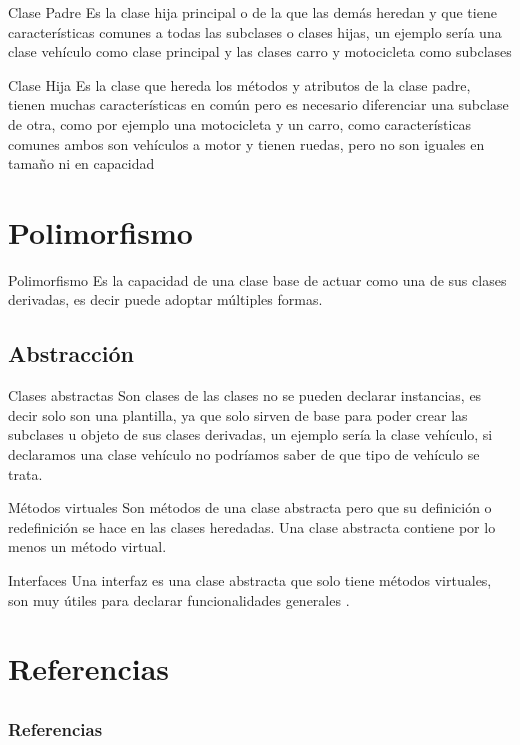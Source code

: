 \documentclass{beamer}
\begin{document}
\begin{frame}{Clase Padre}
	Es la clase hija principal o de la que las dem\'as heredan y que tiene caracter\'isticas comunes a todas las subclases o clases hijas, un ejemplo ser\'ia una clase veh\'iculo como clase principal y las clases carro y motocicleta
	como subclases 
\end{frame}

\begin{frame}{Clase Hija}
	Es la clase que hereda los m\'etodos y atributos de la clase padre, tienen muchas caracter\'isticas en com\'un pero es necesario diferenciar una subclase de otra, como por ejemplo una motocicleta y un carro, como caracter\'isticas comunes ambos son veh\'iculos a motor y tienen ruedas, pero no son iguales en tamaño ni en capacidad
\end{frame}

\section{Polimorfismo}

\begin{frame}{Polimorfismo}
	Es la capacidad de una clase base de actuar como una de sus clases derivadas, es decir puede adoptar m\'ultiples formas.
\end{frame}

\subsection{Abstracci\'on}

\begin{frame}{Clases abstractas}
	Son clases de las clases no se pueden declarar instancias, es decir solo son una plantilla, ya que solo sirven de base para poder crear las subclases u objeto de sus clases derivadas, un ejemplo ser\'ia
	la clase veh\'iculo, si declaramos una clase veh\'iculo no podr\'iamos saber de que tipo de veh\'iculo se trata.
\end{frame}

\begin{frame}{M\'etodos virtuales}
	Son m\'etodos de una clase abstracta pero que su definici\'on o redefinici\'on se hace en las clases heredadas. Una clase abstracta contiene por lo menos un m\'etodo virtual.
\end{frame}

\begin{frame}{Interfaces}
	Una interfaz es una clase abstracta que solo tiene m\'etodos virtuales, son muy \'utiles para declarar funcionalidades generales .\nocite{BHASIN,BJARNE1,BJARNE2,CAIRO,CPP,DEITEL,DOWNEY,JAWORSKI,KENN,lAAKMANN,MATTHES,RAMALHO,SED,BRASSARD}
\end{frame}

\section{Referencias}
\subsection{}
\begin{frame}[allowframebreaks]
	
	\frametitle{Referencias}
	
	
\end{frame}
\end{document}
